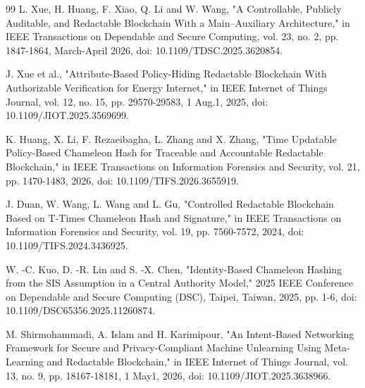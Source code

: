 \documentclass[lettersize,journal]{IEEEtran}
\begin{document}
\begin{thebibliography}{99}
    L. Xue, H. Huang, F. Xiao, Q. Li and W. Wang, "A Controllable, Publicly Auditable, and Redactable Blockchain With a Main–Auxiliary Architecture," in IEEE Transactions on Dependable and Secure Computing, vol. 23, no. 2, pp. 1847-1864, March-April 2026, doi: 10.1109/TDSC.2025.3620854.
    
    J. Xue et al., "Attribute-Based Policy-Hiding Redactable Blockchain With Authorizable Verification for Energy Internet," in IEEE Internet of Things Journal, vol. 12, no. 15, pp. 29570-29583, 1 Aug.1, 2025, doi: 10.1109/JIOT.2025.3569699.
    
    
    K. Huang, X. Li, F. Rezaeibagha, L. Zhang and X. Zhang, "Time Updatable Policy-Based Chameleon Hash for Traceable and Accountable Redactable Blockchain," in IEEE Transactions on Information Forensics and Security, vol. 21, pp. 1470-1483, 2026, doi: 10.1109/TIFS.2026.3655919.
    
    J. Duan, W. Wang, L. Wang and L. Gu, "Controlled Redactable Blockchain Based on T-Times Chameleon Hash and Signature," in IEEE Transactions on Information Forensics and Security, vol. 19, pp. 7560-7572, 2024, doi: 10.1109/TIFS.2024.3436925. 
    
    W. -C. Kuo, D. -R. Lin and S. -X. Chen, "Identity-Based Chameleon Hashing from the SIS Assumption in a Central Authority Model," 2025 IEEE Conference on Dependable and Secure Computing (DSC), Taipei, Taiwan, 2025, pp. 1-6, doi: 10.1109/DSC65356.2025.11260874.
    
    M. Shirmohammadi, A. Islam and H. Karimipour, "An Intent-Based Networking Framework for Secure and Privacy-Compliant Machine Unlearning Using Meta-Learning and Redactable Blockchain," in IEEE Internet of Things Journal, vol. 13, no. 9, pp. 18167-18181, 1 May1, 2026, doi: 10.1109/JIOT.2025.3638966. 
    \end{thebibliography}
    
    
\end{document}
